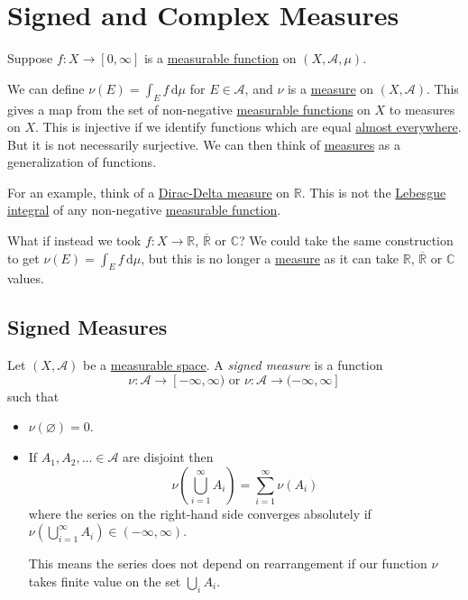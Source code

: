 \chapter{Signed and Complex Measures}\label{ch:Signed-and-Complex-Measures}
\begin{prev}
	Suppose \(f \colon X \to [0,\infty]\) is a \hyperref[def:measurable-function]{measurable function} on \((X, \mathcal{A}, \mu)\).

	We can define \(\nu(E) = \int_E f \,\mathrm{d} \mu\)  for \(E \in \mathcal{A}\), and \(\nu\) is a \hyperref[def:measure]{measure} on \((X, \mathcal{A})\).
	This gives a map from the set of non-negative \hyperref[def:measurable-function]{measurable functions} on \(X\) to measures on \(X\). This is
	injective if we identify functions which are equal \hyperref[def:mu-almost-everywhere]{almost everywhere}. But it is not necessarily surjective.
	We can then think of \hyperref[def:measure]{measures} as a generalization of functions.

	For an example, think of a \hyperref[eg:Dirac-Delta measure]{Dirac-Delta measure} on \(\mathbb{R}\). This is not the \hyperref[def:integrable]{Lebesgue integral}
	of any non-negative \hyperref[def:measurable-function]{measurable function}.
\end{prev}

What if instead we took \(f \colon X \to \mathbb{R}\), \(\overline{\mathbb{R}}\) or \(\mathbb{C}\)? We could take the same construction to get
\(\nu(E) = \int_E f \,\mathrm{d} \mu\), but this is no longer a \hyperref[def:measure]{measure} as it can take \(\mathbb{R}\), \(\overline{\mathbb{R}}\) or \(\mathbb{C}\) values.

\section{Signed Measures}
\begin{definition}\label{def:signed-measure}
	Let \((X, \mathcal{A})\) be a \hyperref[def:measurable-space]{measurable space}. A \emph{signed measure} is a function
	\[
		\nu \colon \mathcal{A} \to [-\infty,\infty)\text{ or } \nu \colon \mathcal{A} \to  (-\infty, \infty]
	\]
	such that
	\begin{itemize}
		\item \(\nu(\varnothing ) = 0\).
		\item If \(A_1,A_2,\dots \in \mathcal{A}\) are disjoint then
		      \[
			      \nu\left( \bigcup_{i=1}^\infty A_i \right) = \sum_{i=1}^\infty \nu(A_i)
		      \]
		      where the series on the right-hand side converges absolutely if \(\nu\left( \bigcup_{i=1}^\infty A_{i} \right) \in (-\infty,\infty)\).
		      \begin{remark}
			      This means the series does not depend on rearrangement if our function \(\nu \) takes finite value on the set \(\bigcup_i A_{i} \).
		      \end{remark}
	\end{itemize}
\end{definition}

